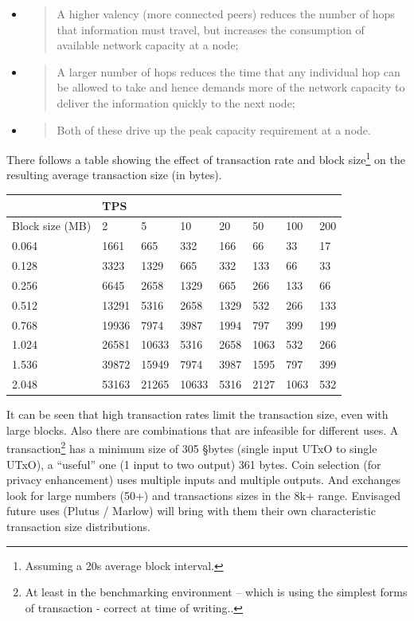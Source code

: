 \documentclass[]{article}
\begin{document}
\begin{itemize}
  \begin{itemize}
  \item
    \begin{quote}
    A higher valency (more connected peers) reduces the number of hops
    that information must travel, but increases the consumption of
    available network capacity at a node;
    \end{quote}
  \item
    \begin{quote}
    A larger number of hops reduces the time that any individual hop can
    be allowed to take and hence demands more of the network capacity to
    deliver the information quickly to the next node;
    \end{quote}
  \item
    \begin{quote}
    Both of these drive up the peak capacity requirement at a node.
    \end{quote}
  \end{itemize}
\end{itemize}

There follows a table showing the effect of transaction rate and block
size\footnote{Assuming a 20s average block interval.} on the resulting
average transaction size (in bytes).

\begin{longtable}[]{@{}llllllll@{}}
\toprule
& TPS & & & & & &\tabularnewline
\midrule
\endhead
Block size (MB) & 2 & 5 & 10 & 20 & 50 & 100 & 200\tabularnewline
0.064 & 1661 & 665 & 332 & 166 & 66 & 33 & 17\tabularnewline
0.128 & 3323 & 1329 & 665 & 332 & 133 & 66 & 33\tabularnewline
0.256 & 6645 & 2658 & 1329 & 665 & 266 & 133 & 66\tabularnewline
0.512 & 13291 & 5316 & 2658 & 1329 & 532 & 266 & 133\tabularnewline
0.768 & 19936 & 7974 & 3987 & 1994 & 797 & 399 & 199\tabularnewline
1.024 & 26581 & 10633 & 5316 & 2658 & 1063 & 532 & 266\tabularnewline
1.536 & 39872 & 15949 & 7974 & 3987 & 1595 & 797 & 399\tabularnewline
2.048 & 53163 & 21265 & 10633 & 5316 & 2127 & 1063 & 532\tabularnewline
\bottomrule
\end{longtable}

It can be seen that high transaction rates limit the transaction size,
even with large blocks. Also there are combinations that are infeasible
for different uses. A transaction\footnote{At least in the benchmarking
  environment -- which is using the simplest forms of transaction -
  correct at time of writing..} has a minimum size of 305 §bytes (single
input UTxO to single UTxO), a ``useful'' one (1 input to two output) 361
bytes. Coin selection (for privacy enhancement) uses multiple inputs and
multiple outputs. And exchanges look for large numbers (50+) and
transactions sizes in the 8k+ range. Envisaged future uses (Plutus /
Marlow) will bring with them their own characteristic transaction size
distributions.
\end{document}
